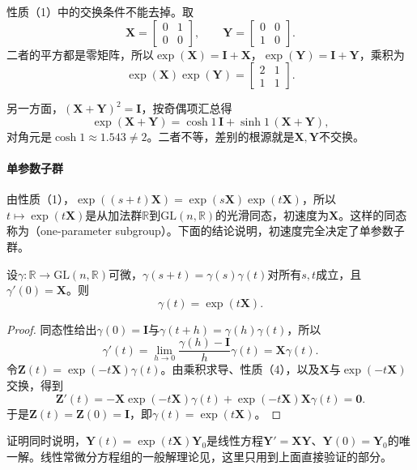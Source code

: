 性质（1）中的交换条件不能去掉。取
\[
\bm X=\begin{bmatrix}0&1\\0&0\end{bmatrix},\qquad
\bm Y=\begin{bmatrix}0&0\\1&0\end{bmatrix}.
\]
二者的平方都是零矩阵，所以$\exp(\bm X)=\bm I+\bm X$，$\exp(\bm Y)=\bm I+\bm Y$，乘积为
\[
\exp(\bm X)\exp(\bm Y)=\begin{bmatrix}2&1\\1&1\end{bmatrix}.
\]

另一方面，$(\bm X+\bm Y)^2=\bm I$，按奇偶项汇总得
\[
\exp(\bm X+\bm Y)=\cosh1\,\bm I+\sinh1\,(\bm X+\bm Y),
\]
对角元是$\cosh1\approx1.543\neq2$。二者不等，差别的根源就是$\bm X,\bm Y$不交换。

\paragraph{单参数子群}
由性质（1），$\exp((s+t)\bm X)=\exp(s\bm X)\exp(t\bm X)$，所以$t\mapsto\exp(t\bm X)$是从加法群$\mathbb R$到$\mathrm{GL}(n,\mathbb R)$的光滑同态，初速度为$\bm X$。这样的同态称为（one-parameter subgroup）。下面的结论说明，初速度完全决定了单参数子群。

\begin{theorem}[单参数子群由初速度决定]
\label{thm:lie-one-parameter-subgroup}
设$\gamma:\mathbb R\to\mathrm{GL}(n,\mathbb R)$可微，$\gamma(s+t)=\gamma(s)\gamma(t)$对所有$s,t$成立，且$\gamma'(0)=\bm X$。则
\begin{equation}
 \gamma(t)=\exp(t\bm X).
 \label{eq:lie-one-parameter-subgroup}
\end{equation}
\end{theorem}

\begin{proof}
同态性给出$\gamma(0)=\bm I$与$\gamma(t+h)=\gamma(h)\gamma(t)$，所以
\[
\gamma'(t)=\lim_{h\to0}\frac{\gamma(h)-\bm I}{h}\gamma(t)=\bm X\gamma(t).
\]
令$\bm Z(t)=\exp(-t\bm X)\gamma(t)$。由乘积求导、性质（4），以及$\bm X$与$\exp(-t\bm X)$交换，得到
\[
\bm Z'(t)=-\bm X\exp(-t\bm X)\gamma(t)+\exp(-t\bm X)\bm X\gamma(t)=\bm0.
\]
于是$\bm Z(t)=\bm Z(0)=\bm I$，即$\gamma(t)=\exp(t\bm X)$。
\end{proof}

证明同时说明，$\bm Y(t)=\exp(t\bm X)\bm Y_0$是线性方程$\bm Y'=\bm X\bm Y$、$\bm Y(0)=\bm Y_0$的唯一解。线性常微分方程组的一般解理论见，这里只用到上面直接验证的部分。


